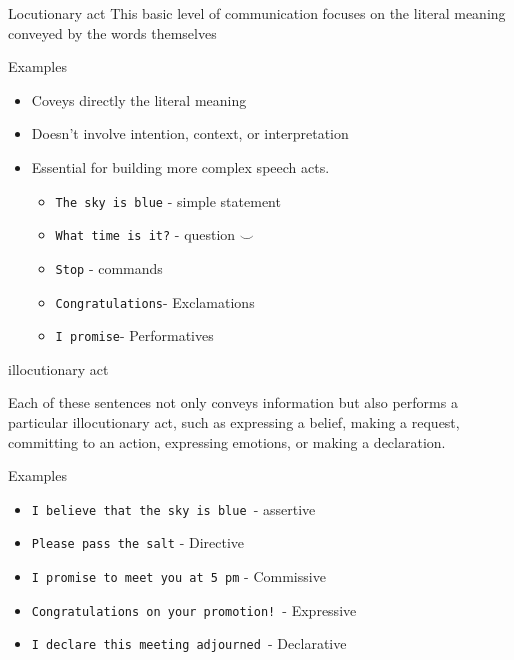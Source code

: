 \begin{frame}[fragile]{Locutionary act}
            This basic level of communication focuses on the literal meaning conveyed by the words themselves

    \begin{block}{Examples}

    \begin{itemize}
        \item Coveys directly the  literal meaning
        \item Doesn't involve intention, context, or interpretation

      \item Essential for building more complex speech acts.
        \begin{itemize}
            \item  \verb|The sky is blue| - simple statement
            \item \verb|What time is it?| - question $\smile$
            \item \verb|Stop| - commands
            \item \verb|Congratulations|- Exclamations
            \item \verb|I promise|- Performatives
        \end{itemize}
    \end{itemize}
    \end{block}
\end{frame}
\begin{frame}[fragile]{illocutionary act}

    Each of these sentences not only conveys information but also performs a particular illocutionary act, such as expressing a belief, making a request, committing to an action, expressing emotions, or making a declaration.
    \begin{block}{Examples}
     \begin{itemize}
         \item \verb|I believe that the sky is blue |- assertive
         \item  \verb|Please pass the salt| - Directive
         \item \verb|I promise to meet you at 5 pm| - Commissive
         \item \verb|Congratulations on your promotion! |- Expressive
         \item  \verb|I declare this meeting adjourned |- Declarative
     \end{itemize}
    \end{block}
\end{frame}

